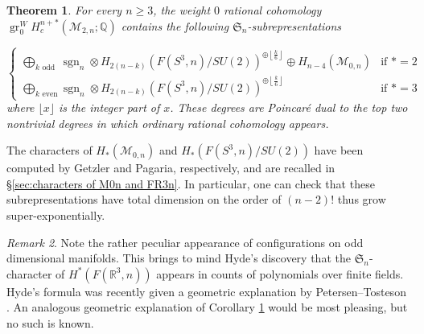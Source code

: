 \documentclass[12pt]{article}
\newcommand{\Q}{\mathbb{Q}}
\newcommand{\R}{\mathbb{R}}
\newcommand{\SymGroup}[1][n]{\mathfrak{S}_{#1}}
\newcommand{\ModuliCurve}[1]{\mathcal{M}_{#1}}
\newcommand{\sgn}[1][n]{\operatorname{sgn}_{#1}}
\DeclareMathOperator{\gr}{gr}
\theoremstyle{plain}
\newtheorem{thm}{Theorem}[section]
\theoremstyle{definition}
\theoremstyle{remark}
\newtheorem{rmk}[thm]{Remark}
\begin{document}
\begin{thm} \label{thm:subrep of M2n}
For every $n\geq 3$, the weight $0$ rational cohomology $\gr^W_0 H^{n+*}_c(\ModuliCurve{2,n};\Q)$ contains the following $\SymGroup$-subrepresentations

\begin{equation*}
\begin{cases}
\underset{k \text{ odd }}{\bigoplus} { \sgn\otimes H_{2(n-k)}(F(S^3,n)/SU(2))}^{\oplus \left\lfloor\frac{k}{6}\right\rfloor} \oplus H_{n-4}(\ModuliCurve{0,n}) & \text{if }  *=2 \\
\underset{k \text{ even}}{\bigoplus}  { \sgn\otimes H_{2(n-k)}(F(S^3,n)/SU(2))} ^{\oplus \left\lfloor\frac{k}{6}\right\rfloor} & \text{if }  *=3 
\end{cases}
\end{equation*}
where $\lfloor x\rfloor$ is the integer part of $x$. These degrees are Poincar\'{e} dual to the top two nontrivial degrees in which ordinary rational cohomology appears.



\end{thm}

The characters of $H_*(\ModuliCurve{0,n})$ and $H_{*}(F(S^3,n)/SU(2))$ have been computed by Getzler and Pagaria, respectively, and are recalled in \S\ref{sec:characters of M0n and FR3n}. In particular, one can check that these subrepresentations have total dimension on the order of $(n-2)!$ thus grow super-exponentially.

\begin{rmk}
Note the rather peculiar appearance %
of configurations on odd dimensional manifolds. This brings to mind Hyde's discovery \cite{Hyde20} that the $\SymGroup$-character of $H^*(F(\R^3,n))$ appears in counts of polynomials over finite fields. Hyde's formula was recently given a geometric explanation by Petersen--Tosteson \cite{PT21}. An analogous geometric explanation of Corollary \ref{thm:subrep of M2n} would be most pleasing, but no such is known.
\end{rmk}
\end{document}

